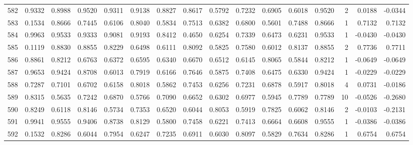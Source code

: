 \begin{tabular}{lrrrrrrrrrrrrrrr}
582 &      0.9332 &  0.8988 &  0.9520 &  0.9311 &  0.9138 &  0.8827 &  0.8617 &  0.5792 &  0.7232 &  0.6905 &   0.6018 &     0.9520 &      2 &                    0.0188 &                    -0.0344 \\
583 &      0.1534 &  0.8666 &  0.7445 &  0.6106 &  0.8040 &  0.5834 &  0.7513 &  0.6382 &  0.6800 &  0.5601 &   0.7488 &     0.8666 &      1 &                    0.7132 &                     0.7132 \\
584 &      0.9963 &  0.9533 &  0.9333 &  0.9081 &  0.9193 &  0.8412 &  0.4650 &  0.6254 &  0.7339 &  0.6473 &   0.6231 &     0.9533 &      1 &                   -0.0430 &                    -0.0430 \\
585 &      0.1119 &  0.8830 &  0.8855 &  0.8229 &  0.6498 &  0.6111 &  0.8092 &  0.5825 &  0.7580 &  0.6012 &   0.8137 &     0.8855 &      2 &                    0.7736 &                     0.7711 \\
586 &      0.8861 &  0.8212 &  0.6763 &  0.6372 &  0.6595 &  0.6340 &  0.6670 &  0.6512 &  0.6145 &  0.8065 &   0.5844 &     0.8212 &      1 &                   -0.0649 &                    -0.0649 \\
587 &      0.9653 &  0.9424 &  0.8708 &  0.6013 &  0.7919 &  0.6166 &  0.7646 &  0.5875 &  0.7408 &  0.6475 &   0.6330 &     0.9424 &      1 &                   -0.0229 &                    -0.0229 \\
588 &      0.7287 &  0.7101 &  0.6702 &  0.6158 &  0.8018 &  0.5862 &  0.7453 &  0.6256 &  0.7231 &  0.6878 &   0.5917 &     0.8018 &      4 &                    0.0731 &                    -0.0186 \\
589 &      0.8315 &  0.5635 &  0.7242 &  0.6870 &  0.5766 &  0.7090 &  0.6652 &  0.6302 &  0.6977 &  0.5945 &   0.7789 &     0.7789 &     10 &                   -0.0526 &                    -0.2680 \\
590 &      0.8249 &  0.6118 &  0.8146 &  0.5734 &  0.7353 &  0.6520 &  0.6044 &  0.8053 &  0.5919 &  0.7825 &   0.6062 &     0.8146 &      2 &                   -0.0103 &                    -0.2131 \\
591 &      0.9941 &  0.9555 &  0.9406 &  0.8738 &  0.8129 &  0.5800 &  0.7458 &  0.6221 &  0.7413 &  0.6664 &   0.6608 &     0.9555 &      1 &                   -0.0386 &                    -0.0386 \\
592 &      0.1532 &  0.8286 &  0.6044 &  0.7954 &  0.6247 &  0.7235 &  0.6911 &  0.6030 &  0.8097 &  0.5829 &   0.7634 &     0.8286 &      1 &                    0.6754 &                     0.6754 \\

\end{tabular}
